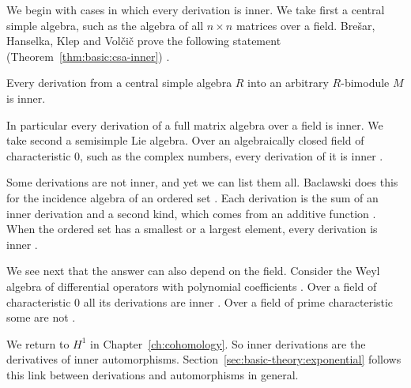 We begin with cases in which every derivation is inner. We take first a central
simple algebra, such as the algebra of all $n \times n$ matrices over a field.
Brešar, Hanselka, Klep and Volčič prove the following statement (Theorem~\ref{thm:basic:csa-inner})
\cite[Corollary~6.2]{BresarHanselkaKlepVolcic2018}.\begin{theorem}\label{thm:basic:csa-inner}
Every derivation from a central simple algebra $R$ into an arbitrary $R$-bimodule
$M$ is inner.
\end{theorem}

In particular every derivation of a full matrix algebra over a field is inner. We take second a semisimple Lie algebra. Over an algebraically closed field of characteristic
$0$, such as the complex numbers, every derivation of it is inner
\cite[\S5.3, p.~23]{Humphreys1972}.

Some derivations are not inner, and yet we can list them all. Baclawski does
this for the incidence algebra of an ordered set \cite[p.~351]{Baclawski1972}.
Each derivation is the sum of an inner derivation and a second kind, which comes
from an additive function \cite[Theorem~2, p.~353]{Baclawski1972}. When the
ordered set has a smallest or a largest element, every derivation is inner
\cite[p.~354]{Baclawski1972}.

We see next that the answer can also depend on the field. Consider the Weyl
algebra of differential operators with polynomial coefficients
\cite[p.~46]{BenkartLopesOndrus2015}. Over a field of characteristic $0$ all its
derivations are inner \cite[p.~48]{BenkartLopesOndrus2015}. Over a field of
prime characteristic some are not \cite[p.~48]{BenkartLopesOndrus2015}.

We return to $H^1$ in Chapter~\ref{ch:cohomology}. So inner derivations are the
derivatives of inner automorphisms.
Section~\ref{sec:basic-theory:exponential} follows this link between
derivations and automorphisms in general.
